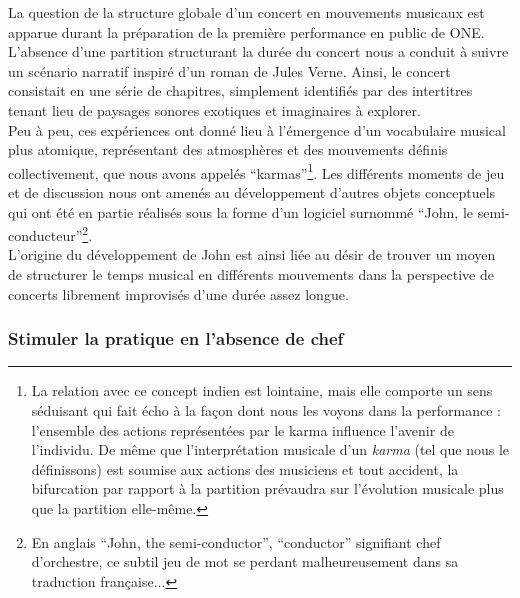 \noindent La question de la structure globale d'un concert en mouvements musicaux est apparue durant la préparation de la première performance en public de ONE. L'absence d'une partition structurant la durée du concert nous a conduit à suivre un scénario narratif inspiré d'un roman de Jules Verne. Ainsi, le concert consistait en une série de chapitres, simplement identifiés par des intertitres tenant lieu de paysages sonores exotiques et imaginaires à explorer.\\
\indent Peu à peu, ces expériences ont donné lieu à l'émergence d'un vocabulaire musical plus atomique, représentant des atmosphères et des mouvements définis collectivement, que nous avons appelés ``karmas''\footnote{La relation avec ce concept indien est lointaine, mais elle comporte un sens séduisant qui fait écho à la façon dont nous les voyons dans la performance : l'ensemble des actions représentées par le karma influence l'avenir de l'individu. De même que l'interprétation musicale d'un \textit{karma} (tel que nous le définissons) est soumise aux actions des musiciens et tout accident, la bifurcation par rapport à la partition prévaudra sur l'évolution musicale plus que la partition elle-même.}. Les différents moments de jeu et de discussion nous ont amenés au développement d'autres objets conceptuels qui ont été en partie réalisés sous la forme d'un logiciel surnommé ``John, le semi-conducteur''\footnote{En anglais ``John, the semi-conductor'', ``conductor'' signifiant chef d'orchestre, ce subtil jeu de mot se perdant malheureusement dans sa traduction française...}.\\
\indent L'origine du développement de John est ainsi liée au désir de trouver un moyen de structurer le temps musical en différents mouvements dans la perspective de concerts librement improvisés d'une durée assez longue. 

\subsubsection{Stimuler la pratique en l'absence de chef}

